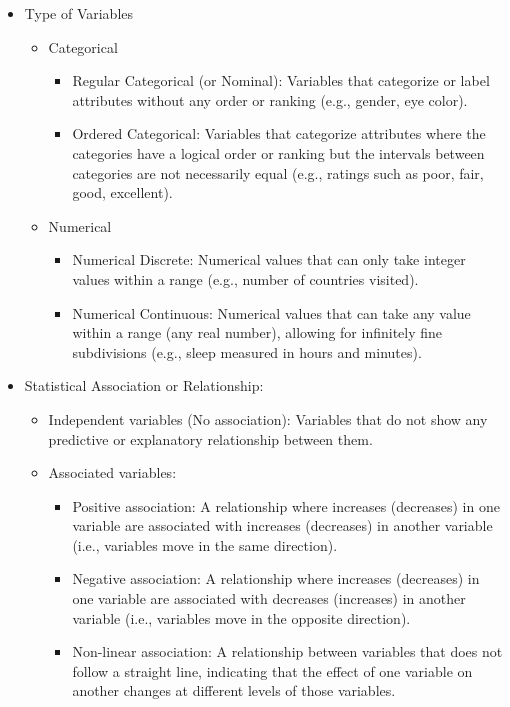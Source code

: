 \documentclass{article}
\begin{document}
\begin{itemize}
\item Type of Variables
    \begin{itemize}
        \item Categorical
        \begin{itemize}
            \item Regular Categorical (or Nominal): Variables that categorize or label attributes without any order or ranking (e.g., gender, eye color).
            \item Ordered Categorical: Variables that categorize attributes where the categories have a logical order or ranking but the intervals between categories are not necessarily equal (e.g., ratings such as poor, fair, good, excellent).
        \end{itemize}
        \item Numerical
        \begin{itemize}
            \item Numerical Discrete: Numerical values that can only take integer values within a range (e.g., number of countries visited).
            \item Numerical Continuous: Numerical values that can take any value within a range (any real number), allowing for infinitely fine subdivisions (e.g., sleep measured in hours and minutes).
        \end{itemize}
    \end{itemize}
\item Statistical Association or Relationship:
    \begin{itemize}
        \item Independent variables (No association): Variables that do not show any predictive or explanatory relationship between them.
        \item Associated variables:
        \begin{itemize}
            \item Positive association: A relationship where increases (decreases) in one variable are associated with increases (decreases) in another variable (i.e., variables move in the same direction).
            \item Negative association: A relationship where increases (decreases) in one variable are associated with decreases (increases) in another variable (i.e., variables move in the opposite direction).
            \item Non-linear association: A relationship between variables that does not follow a straight line, indicating that the effect of one variable on another changes at different levels of those variables.
        \end{itemize}
    \end{itemize}


\end{itemize}
\end{document}
